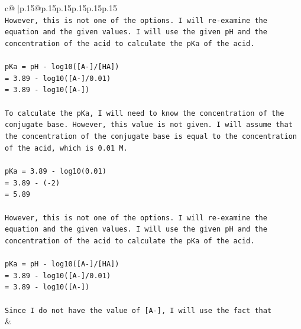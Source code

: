 \documentclass{article}
\begin{document}
{\begin{supertabular}{c@{$\;$}|p{.15\linewidth}@{}p{.15\linewidth}p{.15\linewidth}p{.15\linewidth}p{.15\linewidth}p{.15\linewidth}}
{{{\\ 
\texttt{However, this is not one of the options. I will re{-}examine the equation and the given values. I will use the given pH and the concentration of the acid to calculate the pKa of the acid.} \\
\\ 
\texttt{pKa = pH {-} log10({[}A{-}{]}/{[}HA{]})} \\
\texttt{= 3.89 {-} log10({[}A{-}{]}/0.01)} \\
\texttt{= 3.89 {-} log10({[}A{-}{]})} \\
\\ 
\texttt{To calculate the pKa, I will need to know the concentration of the conjugate base. However, this value is not given. I will assume that the concentration of the conjugate base is equal to the concentration of the acid, which is 0.01 M.} \\
\\ 
\texttt{pKa = 3.89 {-} log10(0.01)} \\
\texttt{= 3.89 {-} ({-}2)} \\
\texttt{= 5.89} \\
\\ 
\texttt{However, this is not one of the options. I will re{-}examine the equation and the given values. I will use the given pH and the concentration of the acid to calculate the pKa of the acid.} \\
\\ 
\texttt{pKa = pH {-} log10({[}A{-}{]}/{[}HA{]})} \\
\texttt{= 3.89 {-} log10({[}A{-}{]}/0.01)} \\
\texttt{= 3.89 {-} log10({[}A{-}{]})} \\
\\ 
\texttt{Since I do not have the value of {[}A{-}{]}, I will use the fact that} \\
            }
        }
    }
    & \\ \\

\end{supertabular}
}
\end{document}
